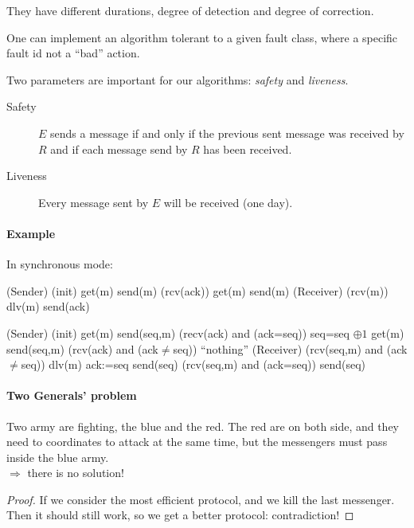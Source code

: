 \documentclass{article}
\begin{document}
They have different durations, degree of detection and degree of correction.
\medskip

One can implement an algorithm tolerant to a given fault class, where a specific fault id not a ``bad'' action.
\bigskip

Two parameters are important for our algorithms: \emph{safety} and \emph{liveness}.


\begin{description}
\item[Safety] $E$ sends a message if and only if the previous sent message was received by $R$ and if each message send by $R$ has been received.
\item[Liveness] Every message sent by $E$ will be received (one day).
\end{description}
\paragraph{Example}
In synchronous mode:


\begin{algorithm}
\Label(Sender){
	\Label(init){
		get(m)\;
		send(m)\;
	}
	\Label(rcv(ack)){
		get(m)\;
		send(m)\;
	}
}
\Label(Receiver){
	\Label(rcv(m)){		
		dlv(m)\;
		send(ack)\;
	}
}
\end{algorithm}


\begin{algorithm}
\Label(Sender){
	\Label(init){
		get(m)\;
		send(seq,m)\;
	}
	\Label({recv(ack) and (ack=seq)}){
		seq=seq $\oplus 1$\;		
		get(m)\;
		send(seq,m)\;
	}
	\Label({rcv(ack) and (ack$\neq$seq)}){
		``nothing''\;
	}
}
\Label(Receiver){
	\Label({rcv(seq,m) and (ack$\neq$seq)}){		
		dlv(m)\;
		ack:=seq\;
		send(seq)\;
	}
	\Label({rcv(seq,m) and (ack=seq)}){
		send(seq)\;
	}
}
\end{algorithm}
\clearpage

\paragraph{Two Generals' problem}
Two army are fighting, the blue and the red. The red are on both side, and they need to coordinates to attack at the same time, but the messengers must pass inside the blue army.\\
$\Rightarrow$ there is no solution!

\begin{proof}
If we consider the most efficient protocol, and we kill the last messenger. Then it should still work, so we get a better protocol: contradiction!
\end{proof}
\end{document}
